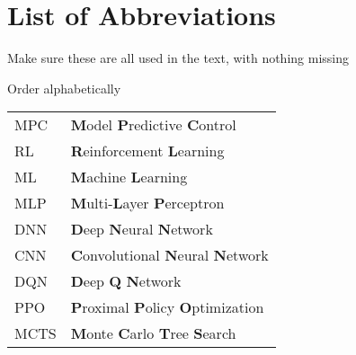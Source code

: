 \chapter*{List of Abbreviations}

\begin{todo}
  Make sure these are all used in the text, with nothing missing
\end{todo}

\begin{todo}
  Order alphabetically
\end{todo}

\begin{table}[h!]
  \centering
  \begin{tabular}{ll}
    MPC & \textbf{M}odel \textbf{P}redictive \textbf{C}ontrol \\
    RL & \textbf{R}einforcement \textbf{L}earning \\
    ML & \textbf{M}achine \textbf{L}earning \\
    MLP & \textbf{M}ulti-\textbf{L}ayer \textbf{P}erceptron \\
    DNN & \textbf{D}eep \textbf{N}eural \textbf{N}etwork \\
    CNN & \textbf{C}onvolutional \textbf{N}eural \textbf{N}etwork \\
    DQN & \textbf{D}eep \textbf{Q} \textbf{N}etwork \\
    PPO & \textbf{P}roximal \textbf{P}olicy \textbf{O}ptimization \\
    MCTS & \textbf{M}onte \textbf{C}arlo \textbf{T}ree \textbf{S}earch \\
  \end{tabular}
\end{table}
